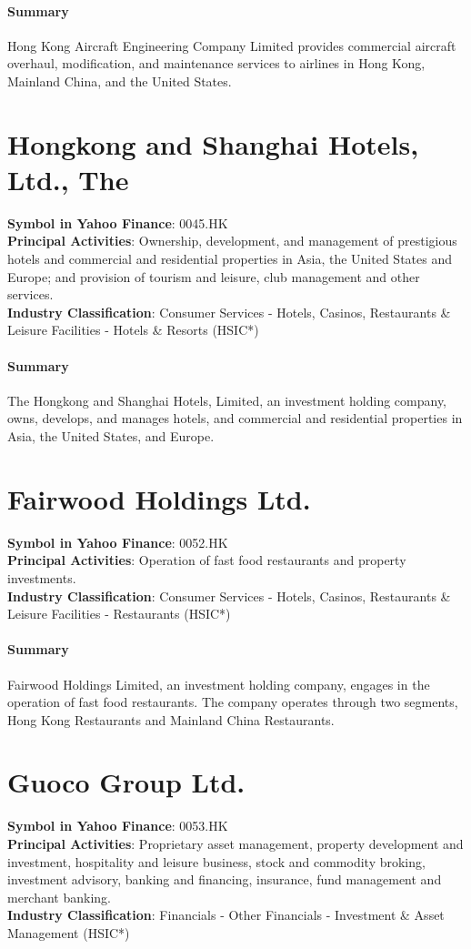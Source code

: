 \paragraph{Summary}
Hong Kong Aircraft Engineering Company Limited provides commercial aircraft overhaul, modification, and maintenance services to airlines in Hong Kong, Mainland China, and the United States.


\section{Hongkong and Shanghai Hotels, Ltd., The}
\textbf{Symbol in Yahoo Finance}: 0045.HK\\
\textbf{Principal Activities}: Ownership, development, and management of prestigious hotels and commercial and residential properties in Asia, the United States and Europe; and provision of tourism and leisure, club management and other services.\\
\textbf{Industry Classification}: Consumer Services - Hotels, Casinos, Restaurants \& Leisure Facilities - Hotels \& Resorts (HSIC*)
\paragraph{Summary}
The Hongkong and Shanghai Hotels, Limited, an investment holding company, owns, develops, and manages hotels, and commercial and residential properties in Asia, the United States, and Europe.


\section{Fairwood Holdings Ltd.}
\textbf{Symbol in Yahoo Finance}: 0052.HK\\
\textbf{Principal Activities}: Operation of fast food restaurants and property investments.\\
\textbf{Industry Classification}: Consumer Services - Hotels, Casinos, Restaurants \& Leisure Facilities - Restaurants (HSIC*)
\paragraph{Summary}
Fairwood Holdings Limited, an investment holding company, engages in the operation of fast food restaurants. The company operates through two segments, Hong Kong Restaurants and Mainland China Restaurants.


\section{Guoco Group Ltd.}
\textbf{Symbol in Yahoo Finance}: 0053.HK\\
\textbf{Principal Activities}: Proprietary asset management, property development and investment, hospitality and leisure business, stock and commodity broking, investment advisory, banking and financing, insurance, fund management and merchant banking.\\
\textbf{Industry Classification}: Financials - Other Financials - Investment \& Asset Management (HSIC*)
